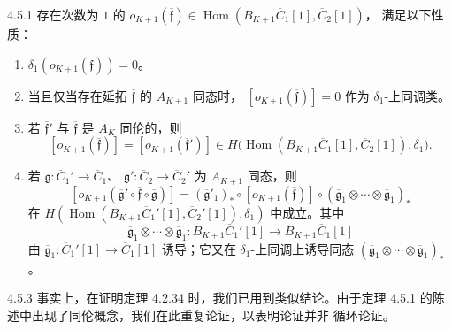 \begin{theorem}{4.5.1}\label{thm:4-5-1}
存在次数为 $1$ 的
$o_{K+1}(\overline{\mathfrak f})\in
\operatorname{Hom}(B_{K+1}\overline C_1[1],\overline C_2[1])$，
满足以下性质：
\begin{enumerate}[label=\textup{(4.5.2.\arabic*)},leftmargin=5.4em]
 \item $\delta_1(o_{K+1}(\overline{\mathfrak f}))=0$。
 \item 当且仅当存在延拓 $\overline{\mathfrak f}$ 的
  $A_{K+1}$ 同态时，
  $[o_{K+1}(\overline{\mathfrak f})]=0$ 作为
  $\delta_1$-上同调类。
 \item 若 $\overline{\mathfrak f}'$ 与
  $\overline{\mathfrak f}$ 是 $A_K$ 同伦的，则
  \[
   [o_{K+1}(\overline{\mathfrak f})]
   =[o_{K+1}(\overline{\mathfrak f}')]
   \in H\bigl(\operatorname{Hom}
   (B_{K+1}\overline C_1[1],\overline C_2[1]),\delta_1\bigr).
  \]
 \item 若
  $\overline{\mathfrak g}\colon\overline C_1'\to\overline C_1$、
  $\overline{\mathfrak g}'\colon\overline C_2\to\overline C_2'$
  为 $A_{K+1}$ 同态，则
  \[
   [o_{K+1}(\overline{\mathfrak g}'\circ
      \overline{\mathfrak f}\circ\overline{\mathfrak g})]
   =(\overline{\mathfrak g}'_1)_*
     \circ[o_{K+1}(\overline{\mathfrak f})]
     \circ(\overline{\mathfrak g}_1\otimes\cdots
       \otimes\overline{\mathfrak g}_1)_*
  \]
  在
  $H(\operatorname{Hom}
  (B_{K+1}\overline C_1'[1],\overline C_2'[1]),\delta_1)$
  中成立。其中
  \[
   \overline{\mathfrak g}_1\otimes\cdots
   \otimes\overline{\mathfrak g}_1\colon
   B_{K+1}\overline C_1'[1]\to B_{K+1}\overline C_1[1]
  \]
  由 $\overline{\mathfrak g}_1\colon
  \overline C_1'[1]\to\overline C_1[1]$ 诱导；它又在
  $\delta_1$-上同调上诱导同态
  $(\overline{\mathfrak g}_1\otimes\cdots
  \otimes\overline{\mathfrak g}_1)_*$。
\end{enumerate}
\end{theorem}

\begin{remark}{4.5.3}\label{rem:4-5-3}
事实上，在证明定理 4.2.34 时，我们已用到类似结论。由于定理
4.5.1 的陈述中出现了同伦概念，我们在此重复论证，以表明论证并非
循环论证。
\end{remark}

